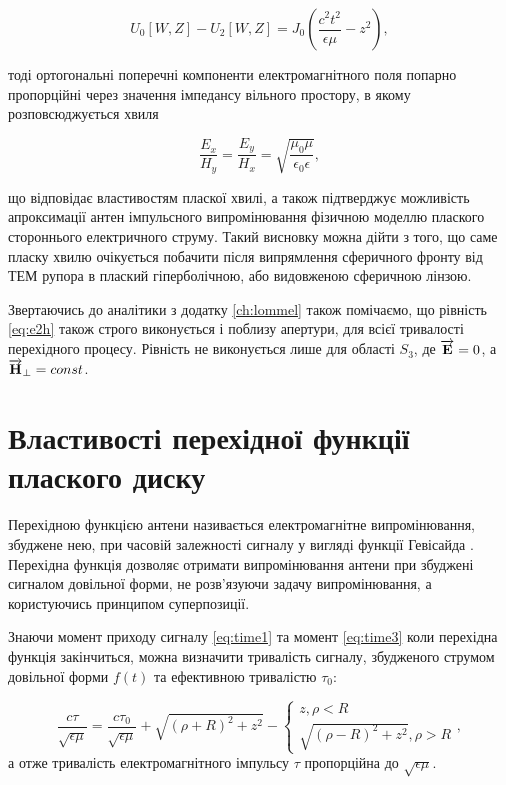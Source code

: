 \begin{equation*}
U_0[ W, Z ] - U_2[ W, Z ] = 
J_0 \left( \frac{c^2t^2}{\epsilon \mu}  - z^2 \right),
\end{equation*}

тоді ортогональні поперечні компоненти електромагнітного поля попарно 
пропорційні через значення імпедансу вільного простору, в якому 
розповсюджується хвиля

\begin{equation} \label{eq:e2h}
\frac{E_x}{H_y} = \frac{E_y}{H_x} = 
\sqrt{\frac{\mu_0 \mu}{\epsilon_0 \epsilon}},
\end{equation}

що відповідає властивостям пласкої хвилі, а також підтверджує можливість 
апроксимації антен імпульсного випромінювання фізичною моделлю плаского 
стороннього електричного струму. Такий висновку можна дійти з того, що
саме пласку хвилю очікується побачити після випрямлення сферичного фронту
від ТЕМ рупора в плаский гіперболічною, або видовженою сферичною лінзою.

Звертаючись до аналітики з додатку \ref{ch:lommel} також помічаємо, що 
рівність \eqref{eq:e2h} також строго виконується і поблизу апертури, для 
всієї тривалості перехідного процесу. Рівність не виконується лише для 
області $ S_3 $, де $ \overrightarrow{\mathbf E} = 0 $, а $ \overrightarrow{\mathbf H}_\perp = const $.

\section{Властивості перехідної функції плаского диску}

Перехідною функцією антени називається електромагнітне випромінювання, 
збуджене нею, при часовій залежності сигналу у вигляді функції Гевісайда
\cite{imp:Kharkevich1950}. Перехідна функція дозволяє отримати 
випромінювання антени при збуджені сигналом довільної форми, не 
розв'язуючи задачу випромінювання, а користуючись принципом суперпозиції.

Знаючи момент приходу сигналу \eqref{eq:time1} та момент \eqref{eq:time3}
коли перехідна функція закінчиться, можна визначити тривалість
сигналу, збудженого струмом довільної форми $ f(t) $ та ефективною 
тривалістю $ \tau_0 $:

\begin{equation} \label{eq:e2h}
\frac{c \tau}{\sqrt{\epsilon \mu}} = \frac{c \tau_0}{\sqrt{\epsilon \mu}} + 
\sqrt{(\rho+R)^2 + z^2} - \begin{cases} z, \rho < R \\ 
\sqrt{(\rho-R)^2 + z^2}, \rho > R \end{cases},
\end{equation}
%
а отже тривалість електромагнітного імпульсу $ \tau $ пропорційна до 
$ \sqrt{\epsilon \mu} $.

